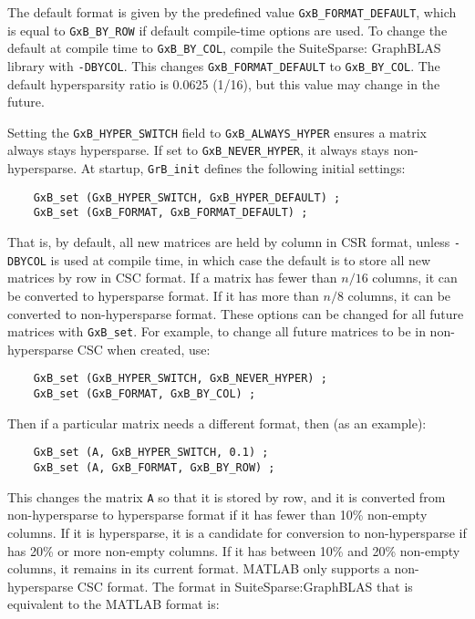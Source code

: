 \documentclass[12pt]{article}
\begin{document}
The default format is given by the predefined value \verb'GxB_FORMAT_DEFAULT',
which is equal to \verb'GxB_BY_ROW' if default compile-time options are used.
To change the default at compile time to \verb'GxB_BY_COL', compile the
SuiteSparse: GraphBLAS library with \verb'-DBYCOL'.  This changes
\verb'GxB_FORMAT_DEFAULT' to \verb'GxB_BY_COL'.  The default hypersparsity
ratio is 0.0625 (1/16), but this value may change in the future.

Setting the \verb'GxB_HYPER_SWITCH' field to \verb'GxB_ALWAYS_HYPER' ensures a matrix
always stays hypersparse.  If set to \verb'GxB_NEVER_HYPER', it always stays
non-hypersparse.  At startup, \verb'GrB_init' defines the following initial
settings:

{\footnotesize
\begin{verbatim}
    GxB_set (GxB_HYPER_SWITCH, GxB_HYPER_DEFAULT) ;
    GxB_set (GxB_FORMAT, GxB_FORMAT_DEFAULT) ;
\end{verbatim} }

That is, by default, all new matrices are held by column in CSR format, unless
\verb'-DBYCOL' is used at compile time, in which case the default is to store
all new matrices by row in CSC format.  If a matrix has fewer than $n/16$
columns, it can be converted to hypersparse format.  If it has more than $n/8$
columns, it can be converted to non-hypersparse format.  These options can be
changed for all future matrices with \verb'GxB_set'.  For example, to change
all future matrices to be in non-hypersparse CSC when created, use:

{\footnotesize
\begin{verbatim}
    GxB_set (GxB_HYPER_SWITCH, GxB_NEVER_HYPER) ;
    GxB_set (GxB_FORMAT, GxB_BY_COL) ;
\end{verbatim} }

Then if a particular matrix needs a different format, then (as an example):

{\footnotesize
\begin{verbatim}
    GxB_set (A, GxB_HYPER_SWITCH, 0.1) ;
    GxB_set (A, GxB_FORMAT, GxB_BY_ROW) ;
\end{verbatim} }

This changes the matrix \verb'A' so that it is stored by row, and it is
converted from non-hypersparse to hypersparse format if it has fewer than 10\%
non-empty columns.  If it is hypersparse, it is a candidate for conversion to
non-hypersparse if has 20\% or more non-empty columns.  If it has between 10\%
and 20\% non-empty columns, it remains in its current format.
MATLAB only supports a non-hypersparse CSC format.  The format in
SuiteSparse:GraphBLAS that is equivalent to the MATLAB format is:
\end{document}
